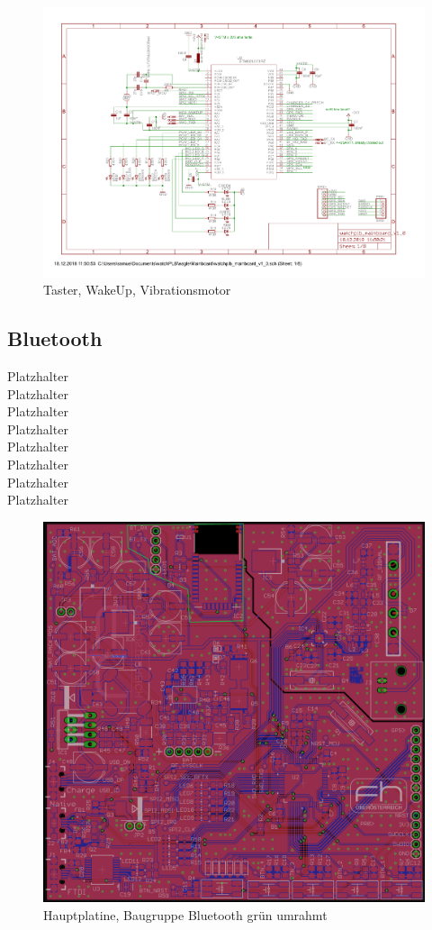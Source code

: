 \documentclass[a4paper]{scrartcl}
\begin{document}
\begin{figure}[H]\centering
\includegraphics[page=4, angle=90, width=\linewidth]{../eagle/Mainboard/watchplb_mainboard_v1_0.pdf}
\caption{Taster, WakeUp, Vibrationsmotor}
\label{fig:abb1}
\end{figure}

\subsection{Bluetooth}

Platzhalter\\Platzhalter\\Platzhalter\\Platzhalter\\Platzhalter\\Platzhalter\\
Platzhalter\\Platzhalter

\begin{figure}[H]\centering
\includegraphics[page=1, angle=0, width=\linewidth]{../Documentation/pics/mainboard_bluetooth.png}
\caption{Hauptplatine, Baugruppe Bluetooth grün umrahmt}
\label{fig:abb1}
\end{figure}
\end{document}

